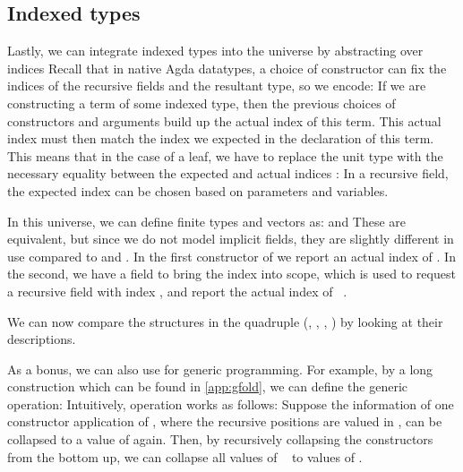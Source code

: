\subsection{Indexed types}\label{ssec:background-ix}
Lastly, we can integrate indexed types into the universe by abstracting over indices
Recall that in native Agda datatypes, a choice of constructor can fix the indices of the recursive fields and the resultant type, so we encode:
If we are constructing a term of some indexed type, then the previous choices of constructors and arguments build up the actual index of this term. This actual index must then match the index we expected in the declaration of this term. This means that in the case of a leaf, we have to replace the unit type with the necessary equality between the expected and actual indices \cite{algorn}:
In a recursive field, the expected index can be chosen based on parameters and variables. %

In this universe, we can define finite types and vectors as:
and
These are equivalent, but since we do not model implicit fields, they are slightly different in use compared to  and . In the first constructor of  we report an actual index of . In the second, we have a field \bN{} to bring the index  into scope, which is used to request a recursive field with index , and report the actual index of \ .

We can now compare the structures in the quadruple (\bN{}, , , ) by looking at their descriptions.

As a bonus, we can also use  for generic programming. For example, by a long construction which can be found in \autoref{app:gfold}, we can define the generic  operation:
Intuitively,  operation works as follows: Suppose the information of one constructor application of , where the recursive positions are valued in , can be collapsed to a value of  again. Then, by recursively collapsing the constructors from the bottom up, we can collapse all values of \  to values of .

